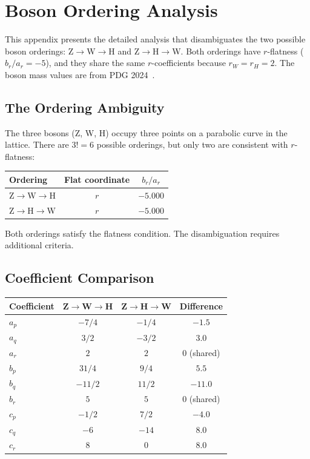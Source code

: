 \section{Boson Ordering Analysis}\label{app:boson_ordering}

This appendix presents the detailed analysis that disambiguates the two possible boson orderings: Z$\to$W$\to$H and Z$\to$H$\to$W. Both orderings have $r$-flatness ($b_r/a_r = -5$), and they share the same $r$-coefficients because $r_W = r_H = 2$. The boson mass values are from PDG 2024~\cite{pdg2024}.

\subsection{The Ordering Ambiguity}\label{app:boson_ambiguity}

The three bosons (Z, W, H) occupy three points on a parabolic curve in the lattice. There are $3! = 6$ possible orderings, but only two are consistent with $r$-flatness:

\begin{center}
\label{tab:boson_orderings}
\begin{tabular}{lcc}
\hline\hline
Ordering & Flat coordinate & $b_r/a_r$ \\
\hline
Z$\to$W$\to$H & $r$ & $-5.000$ \\
Z$\to$H$\to$W & $r$ & $-5.000$ \\
\hline\hline
\end{tabular}
\end{center}

Both orderings satisfy the flatness condition. The disambiguation requires additional criteria.

\subsection{Coefficient Comparison}\label{app:boson_coefficients}

\begin{center}
\label{tab:boson_coeff_compare}
\begin{tabular}{lccc}
\hline\hline
Coefficient & Z$\to$W$\to$H & Z$\to$H$\to$W & Difference \\
\hline
$a_p$ & $-7/4$ & $-1/4$ & $-1.5$ \\
$a_q$ & $3/2$ & $-3/2$ & $3.0$ \\
$a_r$ & $2$ & $2$ & $0$ (shared) \\
$b_p$ & $31/4$ & $9/4$ & $5.5$ \\
$b_q$ & $-11/2$ & $11/2$ & $-11.0$ \\
$b_r$ & $5$ & $5$ & $0$ (shared) \\
$c_p$ & $-1/2$ & $7/2$ & $-4.0$ \\
$c_q$ & $-6$ & $-14$ & $8.0$ \\
$c_r$ & $8$ & $0$ & $8.0$ \\
\hline\hline
\end{tabular}
\end{center}

